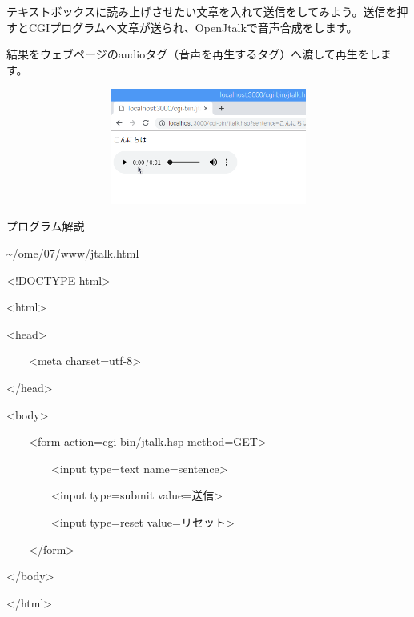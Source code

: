 \documentclass[a4paper,12pt,dvipdfmx]{jarticle}
\begin{document}
テキストボックスに読み上げさせたい文章を入れて送信をしてみよう。送信を押すとCGIプログラムへ文章が送られ、OpenJtalkで音声合成をします。


\bigskip

結果をウェブページのaudioタグ（音声を再生するタグ）へ渡して再生をします。

%
%


\centering
\includegraphics[width=14.392cm,height=3.796cm]{ome7-img057.png}
\flushleft

\clearpage
プログラム解説

\~{}/ome/07/www/jtalk.html



\centering
\begin{boxedminipage}{16.148cm}
{\textless}!DOCTYPE html{\textgreater}

{\textless}html{\textgreater}

{\textless}head{\textgreater}

\ \ \ \ {\textless}meta charset={\textquotedbl}utf-8{\textquotedbl}{\textgreater}

{\textless}/head{\textgreater}

{\textless}body{\textgreater}

\ \ \ \ {\textless}form action={\textquotedbl}cgi-bin/jtalk.hsp{\textquotedbl}
method={\textquotedbl}GET{\textquotedbl}{\textgreater}

\ \ \ \ \ \ \ \ {\textless}input type={\textquotedbl}text{\textquotedbl}
name={\textquotedbl}sentence{\textquotedbl}{\textgreater}

\ \ \ \ \ \ \ \ {\textless}input type={\textquotedbl}submit{\textquotedbl}
value={\textquotedbl}送信{\textquotedbl}{\textgreater}

\ \ \ \ \ \ \ \ {\textless}input type={\textquotedbl}reset{\textquotedbl}
value={\textquotedbl}リセット{\textquotedbl}{\textgreater}

\ \ \ \ {\textless}/form{\textgreater}

{\textless}/body{\textgreater}

{\textless}/html{\textgreater}
\end{boxedminipage}
\flushleft
\bigskip
\end{document}
